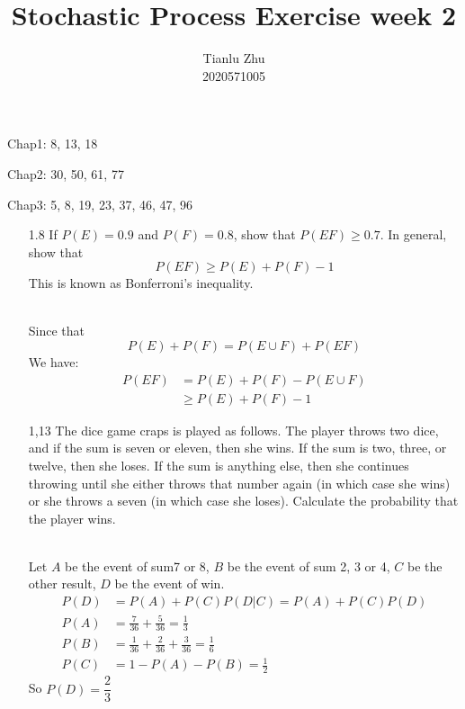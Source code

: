 \documentclass[en,hazy,blue,12pt,device = normal]{elegantnote}
\title{Stochastic Process Exercise week 2}
\author{Tianlu Zhu \\ 2020571005}
\date{}
\begin{document}
\maketitle
Chap1: 8, 13, 18

   Chap2: 30, 50, 61, 77

   Chap3: 5, 8, 19, 23, 37, 46, 47, 96

\begin{enumerate}
    \item[1.8] If $P(E)=0.9$ and $P(F)=0.8$, show that $P(E F) \geq 0.7$. In general, show that
    $$
    P(E F) \geq P(E)+P(F)-1
    $$
    This is known as Bonferroni's inequality.
    \begin{tcolorbox}
        \sol\\
        Since that \[P(E) + P(F) = P(E\cup F) + P(EF)\]
        We have:
        \begin{align*}
            P(EF)&=P(E) + P(F) - P(E\cup F)\\
            &\geq P(E) + P(F) - 1
        \end{align*}
    \end{tcolorbox}

    \item[1,13] The dice game craps is played as follows. The player throws two dice, and if the sum is seven or eleven, then she wins. If the sum is two, three, or twelve, then she loses. If the sum is anything else, then she continues throwing until she either throws that number again (in which case she wins) or she throws a seven (in which case she loses). Calculate the probability that the player wins.
    \begin{tcolorbox}
        \sol \\
        Let \(A\) be the event of sum7 or 8, \(B\) be the event of sum 2, 3 or 4, \(C\) be the other result, \(D\) be the event of win.
        \begin{align*}
            P(D) &= P(A) + P(C) P(D|C) = P(A) + P(C)P(D)\\
            P(A) &= \frac{7}{36} + \frac{5}{36} = \frac{1}{3}\\
            P(B) &= \frac{1}{36} + \frac{2}{36} + \frac{3}{36} = \frac{1}{6}\\
            P(C) &= 1-P(A)-P(B) = \frac{1}{2}
        \end{align*}
        So \(P(D) = \dfrac{2}{3}\)




    \end{tcolorbox}
    

\end{enumerate}
\end{document}
